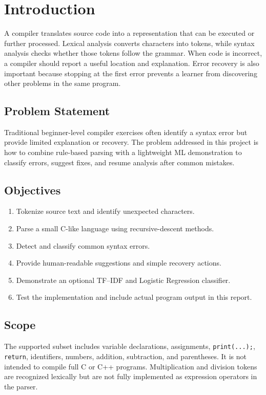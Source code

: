 \documentclass[12pt,a4paper]{article}
\begin{document}
\newpage
\section{Introduction}
A compiler translates source code into a representation that can be executed or further processed. Lexical analysis converts characters into tokens, while syntax analysis checks whether those tokens follow the grammar. When code is incorrect, a compiler should report a useful location and explanation. Error recovery is also important because stopping at the first error prevents a learner from discovering other problems in the same program.

\subsection{Problem Statement}
Traditional beginner-level compiler exercises often identify a syntax error but provide limited explanation or recovery. The problem addressed in this project is how to combine rule-based parsing with a lightweight ML demonstration to classify errors, suggest fixes, and resume analysis after common mistakes.

\subsection{Objectives}
\begin{enumerate}
\item Tokenize source text and identify unexpected characters.
\item Parse a small C-like language using recursive-descent methods.
\item Detect and classify common syntax errors.
\item Provide human-readable suggestions and simple recovery actions.
\item Demonstrate an optional TF--IDF and Logistic Regression classifier.
\item Test the implementation and include actual program output in this report.
\end{enumerate}

\subsection{Scope}
The supported subset includes variable declarations, assignments, \texttt{print(...);}, \texttt{return}, identifiers, numbers, addition, subtraction, and parentheses. It is not intended to compile full C or C++ programs. Multiplication and division tokens are recognized lexically but are not fully implemented as expression operators in the parser.
\end{document}
